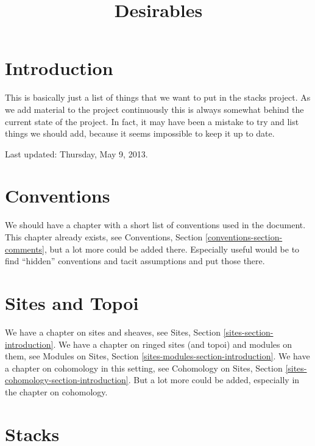 

%


\title{Desirables}

\maketitle

\label{section-phantom}


\tableofcontents

\section{Introduction}
\label{section-introduction}

\noindent
This is basically just a list of things that we want to put in the stacks
project. As we add material to the project continuously this is always
somewhat behind the current state of the project. In fact, it may have
been a mistake to try and list things we should add, because it seems
impossible to keep it up to date.

\medskip\noindent
Last updated: Thursday, May 9, 2013.


\section{Conventions}
\label{section-conventions}

\noindent
We should have a chapter with a short list of conventions used in the document.
This chapter already exists, see
Conventions, Section \ref{conventions-section-comments},
but a lot more could be added there. Especially useful would be to find
``hidden'' conventions and tacit assumptions and put those there.


\section{Sites and Topoi}
\label{section-sites}

\noindent
We have a chapter on sites and sheaves, see
Sites, Section \ref{sites-section-introduction}.
We have a chapter on ringed sites (and topoi) and modules on them, see
Modules on Sites, Section \ref{sites-modules-section-introduction}.
We have a chapter on cohomology in this setting, see
Cohomology on Sites, Section \ref{sites-cohomology-section-introduction}.
But a lot more could be added, especially in the chapter on cohomology.


\section{Stacks}
\label{section-stacks}

